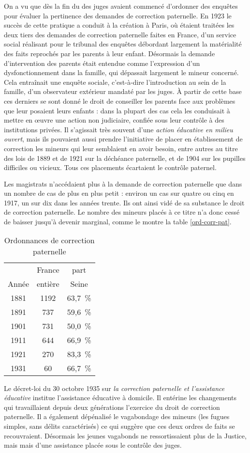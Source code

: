  On a vu que dès la fin du  des juges avaient commencé d'ordonner des enquêtes pour évaluer la pertinence des demandes de correction paternelle. En 1923 le succès de cette pratique a conduit à la création à Paris, où étaient traitées les deux tiers des demandes de correction paternelle faites en France, d'un service social réalisant pour le tribunal des enquêtes débordant largement la matérialité des faits reprochés par les parents à leur enfant. Désormais la demande d'intervention des parents était entendue comme l'expression d'un dysfonctionnement dans la famille, qui dépassait largement le mineur concerné. Cela entraînait une enquête sociale, c'est-à-dire l'introduction au sein de la famille, d'un observateur extérieur mandaté par les juges. À partir de cette base ces derniers se sont donné le droit de conseiller les parents face aux problèmes que leur posaient leurs enfants : dans la plupart des cas cela les conduisait à mettre en œuvre une action non judiciaire, confiée sous leur contrôle à des institutions privées. Il s'agissait très souvent d'une \emph{action éducative en milieu ouvert}, mais ils pouvaient aussi prendre l'initiative de placer en établissement de correction les mineurs qui leur semblaient en avoir besoin, entre autres au titre des lois de 1889 et de 1921 sur la déchéance paternelle, et de 1904 sur les pupilles difficiles ou vicieux. Tous ces placements écartaient le contrôle paternel.

 Les magistrats n'accédaient plus à la demande de correction paternelle que dans un nombre de cas de plus en plus petit : environ un cas sur quatre ou cinq en 1917, un sur dix dans les années trente. Ils ont ainsi vidé de sa substance le droit de correction paternelle. Le nombre des mineurs placés à ce titre n'a donc cessé de baisser jusqu'à devenir marginal, comme le montre la table \vref{ord-corr-pat}.
 
\begin{table}[h]
\centering
\caption{Ordonnances de correction paternelle}
\label{ord-corr-pat}
\begin{tabular}{ccc}
 & France & part \\
Année & entière & Seine \\
\hline
1881 & 1192 & 63,7~\% \\
1891 & 737 & 59,6~\% \\
1901 & 731 & 50,0~\% \\
1911 & 644 & 66,9~\% \\
1921 & 270 & 83,3~\% \\
1931 & 60 & 66,7~\%
\end{tabular}
\end{table}
 
 Le décret-loi du 30 octobre 1935 sur {\emph{la correction paternelle et l'assistance éducative}} institue l'assistance éducative à domicile. Il entérine les changements qui travaillaient depuis deux générations l'exercice du droit de correction paternelle. Il a également dépénalisé le vagabondage des mineurs (les fugues simples, sans délits caractérisés) ce qui suggère que ces deux ordres de faits se recouvraient. Désormais les jeunes vagabonds ne ressortissaient plus de la Justice, mais mais d'une assistance placée sous le contrôle des juges. 



